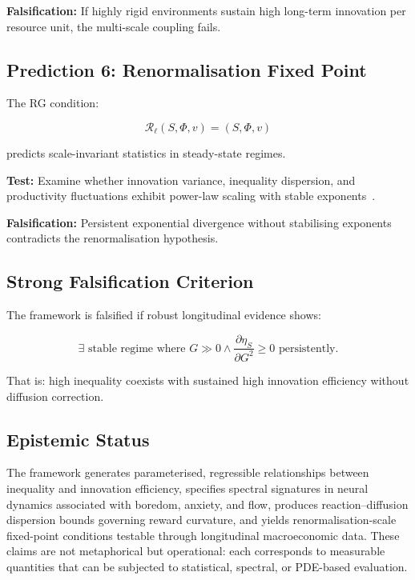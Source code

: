 \documentclass[12pt,a4paper]{article}
\theoremstyle{definition}
\begin{document}
\textbf{Falsification:}
If highly rigid environments sustain
high long-term innovation per resource unit,
the multi-scale coupling fails.

\subsection{Prediction 6: Renormalisation Fixed Point}

The RG condition:

\begin{equation}
  \mathcal{R}_\ell (S,\Phi,v)
  =
  (S,\Phi,v)
\end{equation}

predicts scale-invariant statistics
in steady-state regimes.

\textbf{Test:}
Examine whether innovation variance,
inequality dispersion,
and productivity fluctuations
exhibit power-law scaling
with stable exponents~\citep{stanley1971}.

\textbf{Falsification:}
Persistent exponential divergence
without stabilising exponents
contradicts the renormalisation hypothesis.

\subsection{Strong Falsification Criterion}

The framework is falsified if robust longitudinal evidence shows:

\begin{equation}
  \exists \text{ stable regime where }
  G \gg 0
  \land
  \frac{\partial \eta_S}{\partial G^2} \ge 0
  \text{ persistently}.
\end{equation}

That is:
high inequality coexists with sustained
high innovation efficiency without diffusion correction.

\subsection{Epistemic Status}

The framework generates parameterised, regressible relationships between
inequality and innovation efficiency, specifies spectral signatures in neural
dynamics associated with boredom, anxiety, and flow, produces
reaction–diffusion dispersion bounds governing reward curvature, and yields
renormalisation-scale fixed-point conditions testable through longitudinal
macroeconomic data.  These claims are not metaphorical but operational: each
corresponds to measurable quantities that can be subjected to statistical,
spectral, or PDE-based evaluation.
\end{document}
